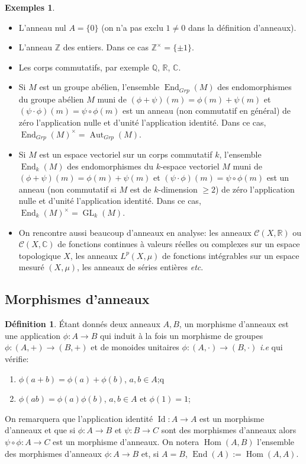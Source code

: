 \documentclass[a4paper, oneside, 12pt]{book}
\theoremstyle{theoremeStyle} %
\theoremstyle{definition} %
\newtheorem{definition}[theoreme]{Définition}
\newtheorem{exemples}[theoreme]{Exemples}
\DeclareMathOperator{\SEnd}{End}
\DeclareMathOperator{\SAut}{Aut}
\DeclareMathOperator{\SHom}{Hom}
\DeclareMathOperator{\SGL}{GL}
\DeclareMathOperator{\Id}{Id}
\newcommand{\Q}{\mathbb{Q}}
\newcommand{\CC}{\mathbb{C}}
\newcommand{\Z}{\mathbb{Z}}
\newcommand{\R}{\mathbb{R}}
\begin{document}
	\begin{exemples}
\begin{itemize}[leftmargin=* ,parsep=0cm,itemsep=0cm,topsep=0cm]
\item L'anneau nul $A=\lbrace 0\rbrace$ (on n'a pas exclu $1\not=0$ dans la définition d'anneaux).
\item L'anneau  $\Z$ des entiers. Dans ce cas  $\Z^\times=\lbrace \pm 1\rbrace$.
\item Les corps commutatifs, par exemple $\Q$, $\R$, $\CC$.
\item Si $M$ est un groupe abélien, l'ensemble $\SEnd_{Grp}(M)$ des endomorphismes du groupe  abélien $M$ muni de $(\phi+\psi)(m)=\phi(m)+\psi(m)$ et $(\psi\cdot\phi)(m)=\psi\circ \phi(m)$ est  un anneau (non commutatif en général) de zéro l'application nulle et d'unité l'application identité. Dans ce cas,  $\SEnd_{Grp}(M)^\times=\SAut_{Grp}(M)$.
\item Si $M$ est un espace vectoriel sur un corps commutatif $k$, l'ensemble $\SEnd_k(M)$ des endomorphismes du $k$-espace vectoriel  $M$ muni de $(\phi+\psi)(m)=\phi(m)+\psi(m)$ et $(\psi\cdot\phi)(m)=\psi\circ \phi(m)$ est un anneau (non commutatif si $M$ est de $k$-dimension $\geq 2$) de zéro l'application nulle et d'unité l'application identité. Dans ce cas, $\SEnd_k(M)^\times=\SGL_k(M)$.
\item On rencontre aussi beaucoup d'anneaux en analyse: les anneaux $\mathcal{C}(X,\R)$ ou $\mathcal{C}(X,\CC)$ de fonctions continues à valeurs réelles  ou complexes sur un espace topologique $X$, les anneaux $L^p(X,\mu)$ de fonctions intégrables  sur un espace mesuré $(X,\mu)$, les anneaux de séries entières \textit{etc}.
\end{itemize}
	\end{exemples}




\subsection{Morphismes d'anneaux}

\begin{definition}Étant donnés deux anneaux $A,B$, un morphisme d'anneaux est une application $\phi:A\rightarrow B$ qui induit à la fois un morphisme de groupes $\phi:(A,+)\rightarrow (B,+)$ et de monoides unitaires $\phi:(A,\cdot)\rightarrow (B,\cdot)$ \textit{i.e} qui vérifie:
\begin{enumerate}
\item $\phi(a+b)=\phi(a)+\phi(b)$, $a,b\in A$;q
\item $\phi(a  b)=\phi(a) \phi(b)$, $a,b\in A$ et $\phi(1)=1$;
\end{enumerate}
\end{definition}
	On remarquera que l'application identité $\Id:A\rightarrow A$ est un morphisme d'anneaux et que si $\phi:A\rightarrow B$ et $\psi:B\rightarrow C$ sont des morphismes d'anneaux alors $\psi\circ \phi:A\rightarrow C$ est un morphisme d'anneaux. On notera $\SHom(A,B)$ l'ensemble des morphismes d'anneaux $\phi:A\rightarrow B$ et, si $A=B$, $\SEnd(A):=\SHom(A,A)$. \\
\end{document}

